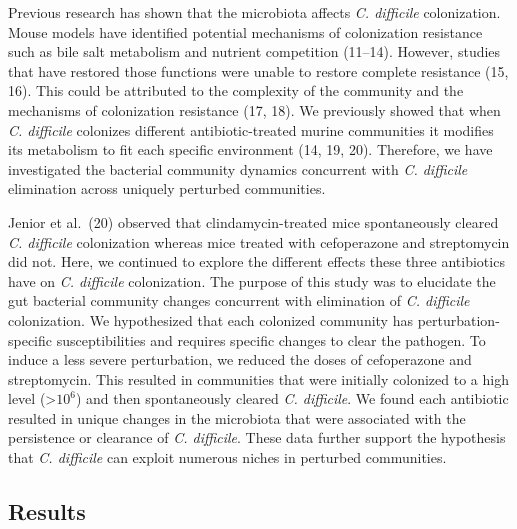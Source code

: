 \documentclass[11pt,]{article}
\begin{document}
Previous research has shown that the microbiota affects \emph{C.
difficile} colonization. Mouse models have identified potential
mechanisms of colonization resistance such as bile salt metabolism and
nutrient competition (11--14). However, studies that have restored those
functions were unable to restore complete resistance (15, 16). This
could be attributed to the complexity of the community and the
mechanisms of colonization resistance (17, 18). We previously showed
that when \emph{C. difficile} colonizes different antibiotic-treated
murine communities it modifies its metabolism to fit each specific
environment (14, 19, 20). Therefore, we have investigated the bacterial
community dynamics concurrent with \emph{C. difficile} elimination
across uniquely perturbed communities.

Jenior et al.~(20) observed that clindamycin-treated mice spontaneously
cleared \emph{C. difficile} colonization whereas mice treated with
cefoperazone and streptomycin did not. Here, we continued to explore the
different effects these three antibiotics have on \emph{C. difficile}
colonization. The purpose of this study was to elucidate the gut
bacterial community changes concurrent with elimination of \emph{C.
difficile} colonization. We hypothesized that each colonized community
has perturbation-specific susceptibilities and requires specific changes
to clear the pathogen. To induce a less severe perturbation, we reduced
the doses of cefoperazone and streptomycin. This resulted in communities
that were initially colonized to a high level (\textgreater{}\(10^{6}\))
and then spontaneously cleared \emph{C. difficile}. We found each
antibiotic resulted in unique changes in the microbiota that were
associated with the persistence or clearance of \emph{C. difficile}.
These data further support the hypothesis that \emph{C. difficile} can
exploit numerous niches in perturbed communities.

\hypertarget{results}{%
\subsection{Results}\label{results}}
\end{document}
